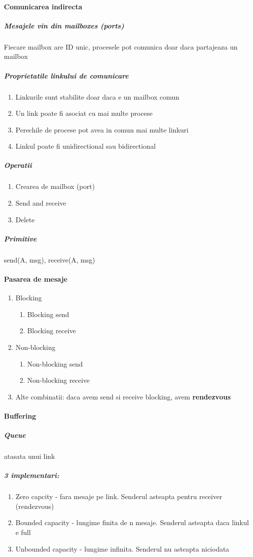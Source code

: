 \documentclass{article}
\begin{document}
\paragraph*{Comunicarea indirecta}
\subparagraph*{Mesajele vin din mailboxes (ports)} Fiecare mailbox are ID unic, procesele pot comunica doar daca partajeaza un mailbox
\subparagraph*{Proprietatile linkului de comunicare}
\begin{enumerate}
    \item Linkurile sunt stabilite doar daca e un mailbox comun
    \item Un link poate fi asociat cu mai multe procese
    \item Perechile de procese pot avea in comun mai multe linkuri
    \item Linkul poate fi unidirectional sau bidirectional
\end{enumerate}
\subparagraph*{Operatii}
\begin{enumerate}
    \item Crearea de mailbox (port)
    \item Send and receive
    \item Delete
\end{enumerate}
\subparagraph*{Primitive} send(A, msg), receive(A, msg)

\paragraph*{Pasarea de mesaje}
\begin{enumerate}
    \item Blocking
    \begin{enumerate}
        \item Blocking send
        \item Blocking receive
    \end{enumerate}
    \item Non-blocking
    \begin{enumerate}
        \item Non-blocking send
        \item Non-blocking receive
    \end{enumerate}
    \item Alte combinatii: daca avem send si receive blocking, avem \textbf{rendezvous}
\end{enumerate}

\paragraph*{Buffering}
\subparagraph*{Queue} atasata unui link
\subparagraph*{3 implementari:}
\begin{enumerate}
    \item Zero capcity - fara mesaje pe link. Senderul asteapta pentru receiver (rendezvous)
    \item Bounded capacity - lungime finita de n mesaje. Senderul asteapta daca linkul e full
    \item Unbounded capacity - lungime infinita. Senderul nu asteapta niciodata
\end{enumerate}
\end{document}
